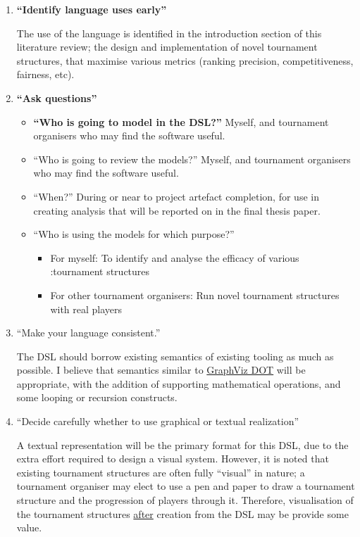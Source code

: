 \documentclass[a4,11pt,twoside,final]{article}
\begin{document}
\begin{enumerate}
\item \textbf{``Identify language uses early''}

The use of the language is identified in the introduction section of this
literature review; the design and implementation of novel tournament
structures, that maximise various metrics (ranking precision,
competitiveness, fairness, etc).

\item \textbf{``Ask questions''}

\begin{itemize}
\item \textbf{``Who is going to model in the DSL?''}
Myself, and tournament organisers who may find the software useful.

\item ``Who is going to review the models?''
Myself, and tournament organisers who may find the software useful.

\item ``When?'' During or near to project artefact completion, for use in creating
analysis that will be reported on in the final thesis paper.

\item ``Who is using the models for which purpose?''
\begin{itemize}
\item For myself: To identify and analyse the efficacy of various :tournament
structures
\item For other tournament organisers: Run novel tournament structures with
real players
\end{itemize}
\end{itemize}

\item ``Make your language consistent.''

The DSL should borrow existing semantics of existing tooling as much as
possible. I believe that semantics similar to \href{https://graphviz.org/doc/info/lang.html}{GraphViz DOT} will be
appropriate, with the addition of supporting mathematical operations, and
some looping or recursion constructs.

\item ``Decide carefully whether to use graphical or textual realization''

A textual representation will be the primary format for this DSL, due to the
extra effort required to design a visual system. However, it is noted that
existing tournament structures are often fully ``visual'' in nature; a
tournament organiser may elect to use a pen and paper to draw a tournament
structure and the progression of players through it. Therefore, visualisation
of the tournament structures \uline{after} creation from the DSL may be provide some
value.


\end{enumerate}
\end{document}
